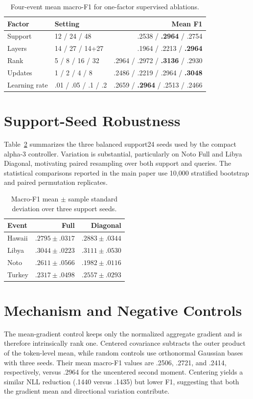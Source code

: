 \documentclass[conference]{IEEEtran}
\begin{document}
\begin{table}[t]
\centering\small
\caption{Four-event mean macro-F1 for one-factor supervised ablations.}
\label{tab:ablations}
\begin{tabular}{llr}
\toprule
Factor & Setting & Mean F1\\
\midrule
Support & 12 / 24 / 48 & .2538 / \textbf{.2964} / .2754\\
Layers & 14 / 27 / 14+27 & .1964 / .2213 / \textbf{.2964}\\
Rank & 5 / 8 / 16 / 32 & .2964 / .2972 / \textbf{.3136} / .2930\\
Updates & 1 / 2 / 4 / 8 & .2486 / .2219 / .2964 / \textbf{.3048}\\
Learning rate & .01 / .05 / .1 / .2 & .2659 / \textbf{.2964} / .2513 / .2466\\
\bottomrule
\end{tabular}
\end{table}

\section{Support-Seed Robustness}
Table~\ref{tab:seedmeans} summarizes the three balanced support24 seeds used by
the compact alpha-3 controller. Variation is substantial, particularly on Noto
Full and Libya Diagonal, motivating paired resampling over both support and
queries. The statistical comparisons reported in the main paper use 10,000
stratified bootstrap and paired permutation replicates.

\begin{table}[t]
\centering\small
\caption{Macro-F1 mean $\pm$ sample standard deviation over three support
seeds.}
\label{tab:seedmeans}
\begin{tabular}{lrr}
\toprule
Event & Full & Diagonal\\
\midrule
Hawaii & $.2795\pm.0317$ & $.2883\pm.0344$\\
Libya & $.3044\pm.0223$ & $.3111\pm.0530$\\
Noto & $.2611\pm.0566$ & $.1982\pm.0116$\\
Turkey & $.2317\pm.0498$ & $.2557\pm.0293$\\
\bottomrule
\end{tabular}
\end{table}

\section{Mechanism and Negative Controls}
The mean-gradient control keeps only the normalized aggregate gradient and is
therefore intrinsically rank one. Centered covariance subtracts the outer
product of the token-level mean, while random controls use orthonormal Gaussian
bases with three seeds. Their mean macro-F1 values are .2506, .2721, and .2414,
respectively, versus .2964 for the uncentered second moment. Centering yields a
similar NLL reduction (.1440 versus .1435) but lower F1, suggesting that both
the gradient mean and directional variation contribute.
\end{document}
